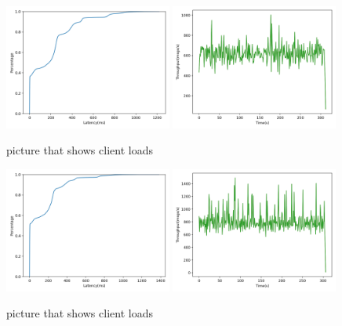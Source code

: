 \begin{figure}[!htb]
  \centering
  \includegraphics[width=0.49\textwidth,height=\textheight,keepaspectratio]{img/constant10_lat.png}
  \includegraphics[width=0.49\textwidth,height=\textheight,keepaspectratio]{img/constant10_tp.png}
  \caption{ picture that shows client loads }
  \label{fig:constant10-performance}
\end{figure}

\begin{figure}[!htb]
  \centering
  \includegraphics[width=0.49\textwidth,height=\textheight,keepaspectratio]{img/constant5_lat.png}
  \includegraphics[width=0.49\textwidth,height=\textheight,keepaspectratio]{img/constant5_tp.png}
  \caption{ picture that shows client loads }
  \label{fig:constant5-performance}
\end{figure}

